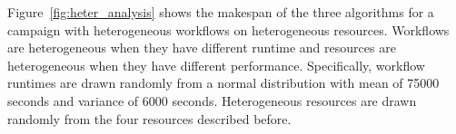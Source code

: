 

Figure~\ref{fig:heter_analysis} shows the makespan of the three algorithms for 
a campaign with heterogeneous workflows on heterogeneous resources. Workflows 
are heterogeneous when they have different runtime and resources are 
heterogeneous when they have different performance. Specifically, workflow 
runtimes are drawn randomly from a normal distribution with mean of 75000 
seconds and variance of 6000 seconds. Heterogeneous resources are drawn 
randomly from the four resources described before.

